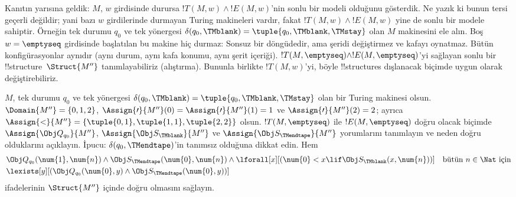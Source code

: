 \begin{explain}
  Kanıtın yarısına geldik: $M$, $w$ girdisinde durursa
  $!T(M,w)\land !E(M,w)$'nin sonlu bir modeli olduğunu gösterdik. Ne yazık ki
  bunun tersi geçerli değildir; yani bazı $w$ girdilerinde durmayan Turing
  makineleri vardır, fakat $!T(M,w)\land !E(M,w)$ yine de sonlu bir modele
  sahiptir. Örneğin tek durumu $q_0$ ve tek yönergesi
  $\delta(q_0,\TMblank)=\tuple{q_0,\TMblank,\TMstay}$ olan $M$ makinesini ele
  alın. Boş $w=\emptyseq$ girdisinde başlatılan bu makine hiç durmaz: Sonsuz
  bir döngüdedir, ama şeridi değiştirmez ve kafayı oynatmaz. Bütün
  konfigürasyonlar aynıdır (aynı durum, aynı kafa konumu, aynı şerit içeriği).
  $!T(M,\emptyseq)\land !E(M,\emptyseq)$'yi sağlayan sonlu bir
  !!{structure}~$\Struct{M''}$ tanımlayabiliriz (alıştırma). Bununla birlikte
  $!T(M,w)$'yi, böyle !!{structure}s dışlanacak biçimde uygun olarak
  değiştirebiliriz.

  \begin{prob}
    $M$, tek durumu $q_0$ ve tek yönergesi
    $\delta(q_0,\TMblank)=\tuple{q_0,\TMblank,\TMstay}$ olan bir Turing
    makinesi olsun. $\Domain{M''}=\{0,1,2\}$,
    $\Assign{\prime}{M''}(0)=\Assign{\prime}{M''}(1)=1$ ve
    $\Assign{\prime}{M''}(2)=2$; ayrıca
    $\Assign{<}{M''}=\{\tuple{0,1},\tuple{1,1},\tuple{2,2}\}$ olsun.
    $!T(M,\emptyseq)$ ile $!E(M,\emptyseq)$ doğru olacak biçimde
    $\Assign{\Obj Q_{q_0}}{M''}$, $\Assign{\Obj S_{\TMblank}}{M''}$ ve
    $\Assign{\Obj S_{\TMendtape}}{M''}$ yorumlarını tanımlayın ve neden
    doğru olduklarını açıklayın. İpucu: $\delta(q_0,\TMendtape)$'in tanımsız
    olduğuna dikkat edin. Hem
    \begin{align*}
    & \Obj Q_{q_0}(\num{1}, \num{n}) \land \Obj S_{\TMendtape}(\num{0}, \num{n})
      \land 
      \lforall[x][(\num{0} < x \lif \Obj S_\TMblank(x, \num{n}))] \text{\quad bütün $n \in \Nat$ için}\\
    & \lexists[y][(\Obj Q_{q_0}(\num{0}, y) \land \Obj S_{\TMendtape}(\num{0}, y))]
    \end{align*}
    ifadelerinin $\Struct{M''}$ içinde doğru olmasını sağlayın.
  \end{prob}
\end{explain}

